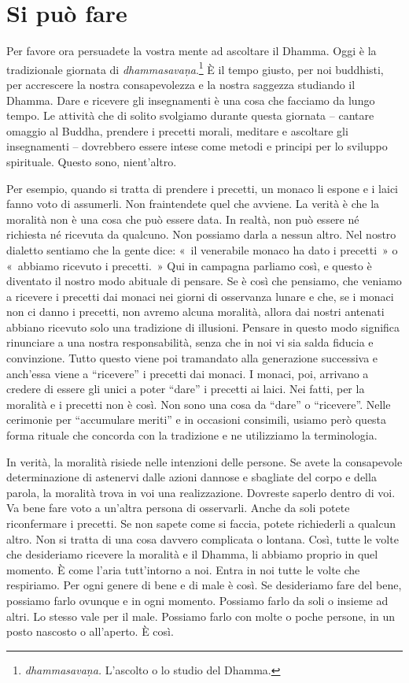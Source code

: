 \chapter{Si può fare}

Per favore ora persuadete la vostra mente ad ascoltare il Dhamma. Oggi è
la tradizionale giornata di \emph{dhammasavaṇa}.\footnote{\emph{dhammasavaṇa.}
  L'ascolto o lo studio del Dhamma.} È il tempo giusto, per noi
buddhisti, per accrescere la nostra consapevolezza e la nostra saggezza
studiando il Dhamma. Dare e ricevere gli insegnamenti è una cosa che
facciamo da lungo tempo. Le attività che di solito svolgiamo durante
questa giornata -- cantare omaggio al Buddha, prendere i precetti
morali, meditare e ascoltare gli insegnamenti -- dovrebbero essere
intese come metodi e principi per lo sviluppo spirituale. Questo sono,
nient'altro.

Per esempio, quando si tratta di prendere i precetti, un monaco li
espone e i laici fanno voto di assumerli. Non fraintendete quel che
avviene. La verità è che la moralità non è una cosa che può essere data.
In realtà, non può essere né richiesta né ricevuta da qualcuno. Non
possiamo darla a nessun altro. Nel nostro dialetto sentiamo che la gente
dice: «~il venerabile monaco ha dato i precetti~» o «~abbiamo ricevuto i
precetti.~» Qui in campagna parliamo così, e questo è diventato il
nostro modo abituale di pensare. Se è così che pensiamo, che veniamo a
ricevere i precetti dai monaci nei giorni di osservanza lunare e che, se
i monaci non ci danno i precetti, non avremo alcuna moralità, allora dai
nostri antenati abbiano ricevuto solo una tradizione di illusioni.
Pensare in questo modo significa rinunciare a una nostra responsabilità,
senza che in noi vi sia salda fiducia e convinzione. Tutto questo viene
poi tramandato alla generazione successiva e anch'essa viene a
``ricevere'' i precetti dai monaci. I monaci, poi, arrivano a credere di
essere gli unici a poter ``dare'' i precetti ai laici. Nei fatti, per la
moralità e i precetti non è così. Non sono una cosa da ``dare'' o
``ricevere''. Nelle cerimonie per ``accumulare meriti'' e in occasioni
consimili, usiamo però questa forma rituale che concorda con la
tradizione e ne utilizziamo la terminologia.

In verità, la moralità risiede nelle intenzioni delle persone. Se avete
la consapevole determinazione di astenervi dalle azioni dannose e
sbagliate del corpo e della parola, la moralità trova in voi una
realizzazione. Dovreste saperlo dentro di voi. Va bene fare voto a
un'altra persona di osservarli. Anche da soli potete riconfermare i
precetti. Se non sapete come si faccia, potete richiederli a qualcun
altro. Non si tratta di una cosa davvero complicata o lontana. Così,
tutte le volte che desideriamo ricevere la moralità e il Dhamma, li
abbiamo proprio in quel momento. È come l'aria tutt'intorno a noi. Entra
in noi tutte le volte che respiriamo. Per ogni genere di bene e di male
è così. Se desideriamo fare del bene, possiamo farlo ovunque e in ogni
momento. Possiamo farlo da soli o insieme ad altri. Lo stesso vale per
il male. Possiamo farlo con molte o poche persone, in un posto nascosto
o all'aperto. È così.

